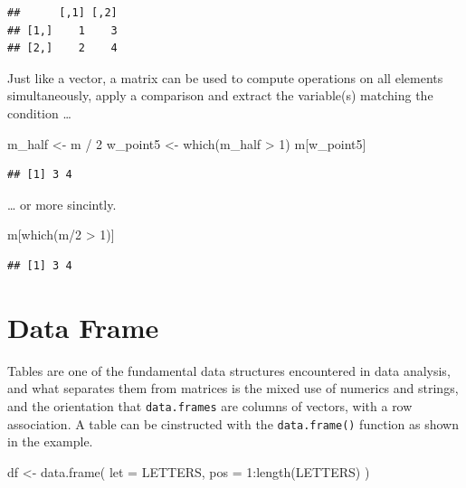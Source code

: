 \documentclass[
]{book}
\newenvironment{Shaded}{\begin{snugshade}}{\end{snugshade}}
\newcommand{\AttributeTok}[1]{\textcolor[rgb]{0.77,0.63,0.00}{#1}}
\newcommand{\DecValTok}[1]{\textcolor[rgb]{0.00,0.00,0.81}{#1}}
\newcommand{\FunctionTok}[1]{\textcolor[rgb]{0.00,0.00,0.00}{#1}}
\newcommand{\NormalTok}[1]{#1}
\newcommand{\OtherTok}[1]{\textcolor[rgb]{0.56,0.35,0.01}{#1}}
\newcommand{\SpecialCharTok}[1]{\textcolor[rgb]{0.00,0.00,0.00}{#1}}
\begin{document}
\begin{verbatim}
##      [,1] [,2]
## [1,]    1    3
## [2,]    2    4
\end{verbatim}

Just like a vector, a matrix can be used to compute operations on all elements simultaneously, apply a comparison and extract the variable(s) matching the condition \ldots{}

\begin{Shaded}
\begin{Highlighting}[]
\NormalTok{m\_half }\OtherTok{\textless{}{-}}\NormalTok{ m }\SpecialCharTok{/} \DecValTok{2}
\NormalTok{w\_point5 }\OtherTok{\textless{}{-}} \FunctionTok{which}\NormalTok{(m\_half }\SpecialCharTok{\textgreater{}} \DecValTok{1}\NormalTok{)}
\NormalTok{m[w\_point5]}
\end{Highlighting}
\end{Shaded}

\begin{verbatim}
## [1] 3 4
\end{verbatim}

\ldots{} or more sincintly.

\begin{Shaded}
\begin{Highlighting}[]
\NormalTok{m[}\FunctionTok{which}\NormalTok{(m}\SpecialCharTok{/}\DecValTok{2} \SpecialCharTok{\textgreater{}} \DecValTok{1}\NormalTok{)]}
\end{Highlighting}
\end{Shaded}

\begin{verbatim}
## [1] 3 4
\end{verbatim}

\hypertarget{data-frame}{%
\section{Data Frame}\label{data-frame}}

Tables are one of the fundamental data structures encountered in data analysis, and what separates them from matrices is the mixed use of numerics and strings, and the orientation that \texttt{data.frames} are columns of vectors, with a row association. A table can be cinstructed with the \texttt{data.frame()} function as shown in the example.

\begin{Shaded}
\begin{Highlighting}[]
\NormalTok{df }\OtherTok{\textless{}{-}} \FunctionTok{data.frame}\NormalTok{(}
  \AttributeTok{let =}\NormalTok{ LETTERS,}
  \AttributeTok{pos =} \DecValTok{1}\SpecialCharTok{:}\FunctionTok{length}\NormalTok{(LETTERS)}
\NormalTok{)}
\end{Highlighting}
\end{Shaded}
\end{document}
